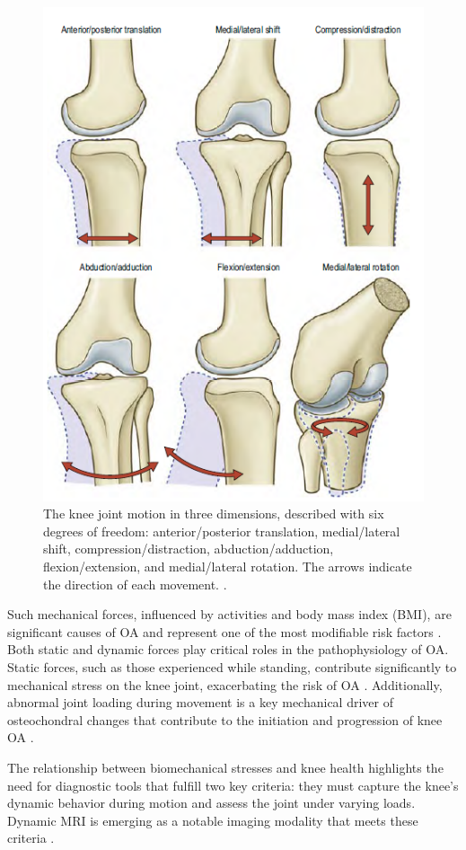 \documentclass{micro-econ-thesis}
\begin{document}
\begin{figure}[H]
	\centering
	\includegraphics[width=0.7\linewidth]{six_degrees}
	\caption{The knee joint motion in three dimensions, described with six degrees of freedom: anterior/posterior translation, medial/lateral shift, compression/distraction, abduction/adduction, flexion/extension, and medial/lateral rotation. The arrows indicate the direction of each movement. \parencite[p.~1412]{standring_grays_2021}.}
	\label{fig:sixdegrees}
\end{figure}

Such mechanical forces, influenced by activities and body mass index (BMI), are significant causes of OA and represent one of the most modifiable risk factors \parencite{heidari_knee_2011}. Both static and dynamic forces play critical roles in the pathophysiology of OA. Static forces, such as those experienced while standing, contribute significantly to mechanical stress on the knee joint, exacerbating the risk of OA \parencite{egloff_biomechanics_2012}. Additionally, abnormal joint loading during movement is a key mechanical driver of osteochondral changes that contribute to the initiation and progression of knee OA \parencite{coburn_immediate_2023}.


The relationship between biomechanical stresses and knee health highlights the need for diagnostic tools that fulfill two key criteria: they must capture the knee's dynamic behavior during motion and assess the joint under varying loads. Dynamic MRI is emerging as a notable imaging modality that meets these criteria \parencite{conconi_-vivo_2023}. 
\end{document}
